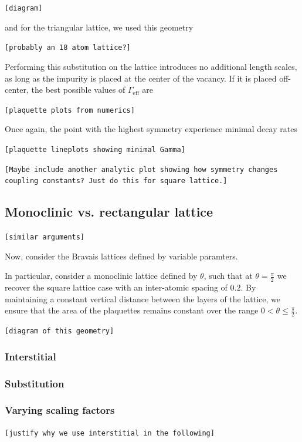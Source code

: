 \documentclass[aps,pra,superscriptaddress,twocolumn]{revtex4-1}
\newcommand{\commentSB}[1]{\texttt{\color{blue}[#1]}}
\newcommand{\commentSO}[1]{\texttt{\color{orange}[#1]}}
\begin{document}
\commentSB{diagram}

and for the triangular lattice, we used this geometry

\commentSB{probably an 18 atom lattice?}

Performing this substitution on the lattice introduces no additional length scales, as long as the impurity is placed at the center of the vacancy. If it is placed off-center, the best possible values of $\Gamma_\text{eff}$ are 

\commentSB{plaquette plots from numerics}

Once again, the point with the highest symmetry experience  minimal decay rates

\commentSB{plaquette lineplots showing minimal Gamma}

\commentSB{Maybe include another analytic plot showing how symmetry changes coupling constants? Just do this for square lattice.}

\subsection{Monoclinic vs. rectangular lattice}
\commentSO{similar arguments}

Now, consider the Bravais lattices defined by variable paramters. 

In particular, consider a monoclinic lattice defined by $\theta$, such that at $\theta = \frac{\pi}{2}$ we recover the square lattice case with an inter-atomic spacing of $0.2$. By maintaining a constant vertical distance between the layers of the lattice, we ensure that the area of the plaquettes remains constant over the range $ 0 < \theta \leq \frac{\pi}{2}$. 

\commentSB{diagram of this geometry}

\subsubsection{Interstitial}


\subsubsection{Substitution}

\subsubsection{Varying scaling factors}
\commentSO{justify why we use interstitial in the following}
\end{document}
